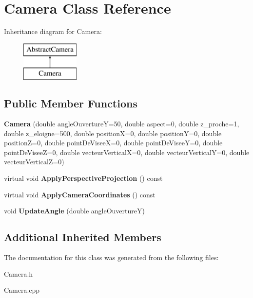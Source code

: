 \hypertarget{classCamera}{}\section{Camera Class Reference}
\label{classCamera}
Inheritance diagram for Camera\+:\begin{figure}[H]
\begin{center}
\leavevmode
\includegraphics[height=2.000000cm]{classCamera}
\end{center}
\end{figure}
\subsection*{Public Member Functions}
\begin{DoxyCompactItemize}
\item 
\mbox{\label{classCamera_acbc289349ac91f5847d1b57f8991eb50}} 
{\bfseries Camera} (double angle\+OuvertureY=50, double aspect=0, double z\+\_\+proche=1, double z\+\_\+eloigne=500, double positionX=0, double positionY=0, double positionZ=0, double point\+De\+ViseeX=0, double point\+De\+ViseeY=0, double point\+De\+ViseeZ=0, double vecteur\+VerticalX=0, double vecteur\+VerticalY=0, double vecteur\+VerticalZ=0)
\item 
\mbox{\label{classCamera_a37af1e20279e9760130e570fb2b9574c}} 
virtual void {\bfseries Apply\+Perspective\+Projection} () const
\item 
\mbox{\label{classCamera_a444a631997e79053d6d64bde60575036}} 
virtual void {\bfseries Apply\+Camera\+Coordinates} () const
\item 
\mbox{\label{classCamera_abd46a581d8cfa78b393209b932f86f70}} 
void {\bfseries Update\+Angle} (double angle\+OuvertureY)
\end{DoxyCompactItemize}
\subsection*{Additional Inherited Members}


The documentation for this class was generated from the following files\+:\begin{DoxyCompactItemize}
\item 
Camera.\+h\item 
Camera.\+cpp\end{DoxyCompactItemize}
